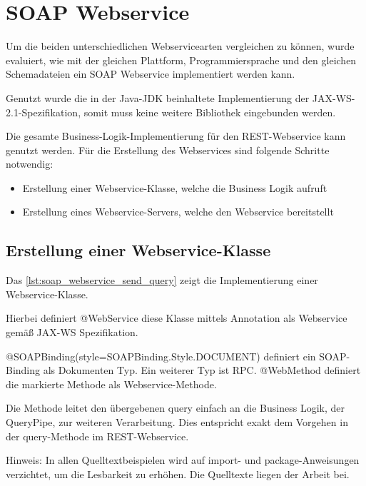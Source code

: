 \chapter{SOAP Webservice} \label{kap:anhang_soap_webservice}

Um die beiden unterschiedlichen Webservicearten vergleichen zu können, wurde evaluiert, wie mit der gleichen Plattform, Programmiersprache und den gleichen Schemadateien ein SOAP \gls{Webservice} implementiert werden kann. 

Genutzt wurde die in der Java-JDK beinhaltete Implementierung der JAX-WS-2.1-Spezifikation, somit muss keine weitere Bibliothek eingebunden werden. 

Die gesamte Business-Logik-Implementierung für den \gls{REST}-\gls{Webservice} kann genutzt werden. Für die Erstellung des \glspl{Webservice} sind folgende Schritte notwendig:

\begin{itemize}
\item Erstellung einer \gls{Webservice}-Klasse, welche die Business Logik aufruft
\item Erstellung eines \gls{Webservice}-Servers, welche den \gls{Webservice} bereitstellt
\end{itemize}

\section{Erstellung einer Webservice-Klasse}

Das \autoref{lst:soap_webservice_send_query} zeigt die Implementierung einer \gls{Webservice}-Klasse. 

Hierbei definiert @WebService diese Klasse mittels Annotation als Webservice gemäß JAX-WS Spezifikation.
 
@SOAPBinding(style=SOAPBinding.Style.DOCUMENT) definiert ein SOAP-Binding als Dokumenten Typ. Ein weiterer Typ ist RPC.
@WebMethod definiert die markierte Methode als \gls{Webservice}-Methode. 

Die Methode leitet den übergebenen query einfach an die Business Logik, der QueryPipe, zur weiteren Verarbeitung. Dies entspricht exakt dem Vorgehen in der query-Methode im \gls{REST}-\gls{Webservice}.  

Hinweis: In allen Quelltextbeispielen wird auf import- und package-Anweisungen verzichtet, um die Lesbarkeit zu erhöhen. Die Quelltexte liegen der Arbeit bei. 

